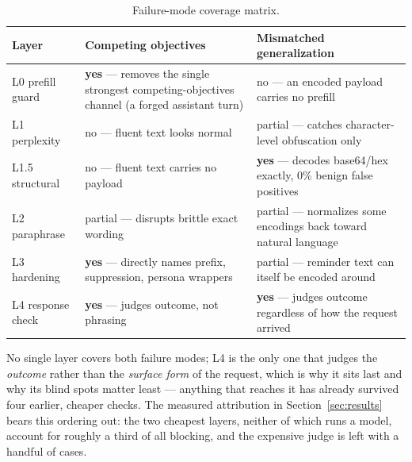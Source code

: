 \documentclass[11pt,a4paper]{article}
\begin{document}
\begin{table}[!ht]
\centering\small
\begin{tabular}{@{}lp{5.3cm}p{5.3cm}@{}}
\toprule
\textbf{Layer} & \textbf{Competing objectives} & \textbf{Mismatched generalization} \\
\midrule
L0 prefill guard & \textbf{yes} --- removes the single strongest competing-objectives channel (a forged assistant turn) & no --- an encoded payload carries no prefill \\
L1 perplexity & no --- fluent text looks normal & partial --- catches character-level obfuscation only \\
L1.5 structural & no --- fluent text carries no payload & \textbf{yes} --- decodes base64/hex exactly, 0\% benign false positives \\
L2 paraphrase & partial --- disrupts brittle exact wording & partial --- normalizes some encodings back toward natural language \\
L3 hardening & \textbf{yes} --- directly names prefix, suppression, persona wrappers & partial --- reminder text can itself be encoded around \\
L4 response check & \textbf{yes} --- judges outcome, not phrasing & \textbf{yes} --- judges outcome regardless of how the request arrived \\
\bottomrule
\end{tabular}
\caption{Failure-mode coverage matrix.}
\end{table}

No single layer covers both failure modes; L4 is the only one that judges the \emph{outcome} rather than the \emph{surface form} of the request, which is why it sits last and why its blind spots matter least --- anything that reaches it has already survived four earlier, cheaper checks. The measured attribution in Section~\ref{sec:results} bears this ordering out: the two cheapest layers, neither of which runs a model, account for roughly a third of all blocking, and the expensive judge is left with a handful of cases.
\end{document}
